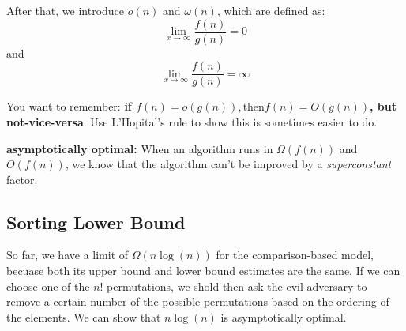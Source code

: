 \documentclass[portrait,10pt, a4paper]{article}
\begin{document}
\begin{multicols*}{3}
			After that, we introduce $o(n)$ and $\omega(n)$, which are defined as:
			\[ \lim_{x\to\infty}\frac{f(n)}{g(n)} = 0\] and 
			\[ \lim_{x\to\infty}\frac{f(n)}{g(n)} = \infty\]
				
			You want to remember: \textbf{if $f(n)=o(g(n)),\text{then} f(n)=O(g(n))$, but not-vice-versa}. Use L'Hopital's
			rule to show this is sometimes easier to do.

			\textbf{asymptotically optimal:} When an algorithm runs in $\Omega(f(n))$ and $O(f(n))$, we know that the 
			algorithm can't be improved by a \textit{superconstant} factor.
		\subsection{Sorting Lower Bound}
			So far, we have a limit of $\Omega(n\log(n))$ for the comparison-based model, becuase both its upper bound and
			lower bound estimates are the same. If we can choose one of the $n!$ permutations, we shold then ask the 
			evil adversary to remove  a certain number of the possible permutations based on the ordering of the elements.
			We can show that $n\log(n)$ is asymptotically optimal.
\end{multicols*}
\end{document}
